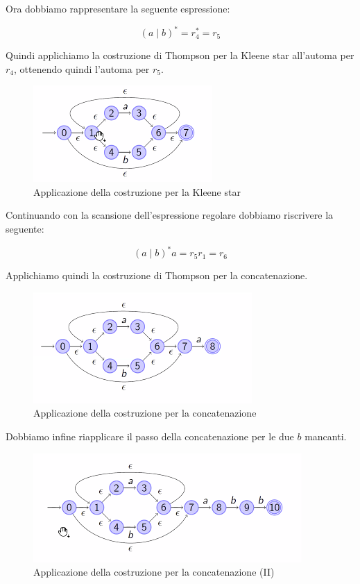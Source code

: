 \documentclass[class=book, crop=false, oneside, 12pt]{standalone}
\begin{document}
\noindent Ora dobbiamo rappresentare la seguente espressione:

\begin{equation*}
    (a\mid b)^\ast = r_4^\ast = r_5
\end{equation*}

\noindent Quindi applichiamo la costruzione di Thompson per la Kleene star all’automa per \(r_4\), ottenendo quindi l’automa per \(r_5\).

\begin{figure}
    \centering
    \includegraphics[width=.5\textwidth,keepaspectratio]{esempio_Thompson_2}
    \caption{Applicazione della costruzione per la Kleene star}
    \label{esempio_Thompson_2}
\end{figure}

\noindent Continuando con la scansione dell’espressione regolare dobbiamo riscrivere la seguente:

\begin{equation}
    (a \mid b)^\ast a = r_5 r_1 = r_6
\end{equation}

\noindent Applichiamo quindi la costruzione di Thompson per la concatenazione.

\begin{figure}
    \centering
    \includegraphics[width=.5\textwidth,keepaspectratio]{esempio_Thompson_3}
    \caption{Applicazione della costruzione per la concatenazione}
    \label{esempio_Thompson_3}
\end{figure}

\noindent Dobbiamo infine riapplicare il passo della concatenazione per le due \(b\) mancanti.

\begin{figure}
    \centering
    \includegraphics[width=.5\textwidth,keepaspectratio]{esempio_Thompson_4}
    \caption{Applicazione della costruzione per la concatenazione (II)}
    \label{esempio_Thompson_4}
\end{figure}
\end{document}

